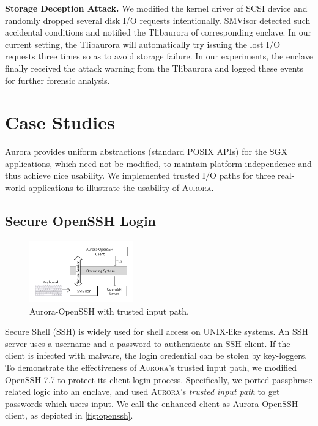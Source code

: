 \textbf{Storage Deception Attack.}
We modified the kernel driver of SCSI device and randomly dropped several disk I/O requests intentionally.  SMVisor detected such accidental conditions and notified the Tlibaurora of corresponding enclave. In our current setting, the Tlibaurora will automatically try issuing the lost I/O requests three times so as to avoid storage failure. In our experiments, the enclave finally received the attack warning from the Tlibaurora and logged these events for further forensic analysis.


\section{Case Studies}\label{casestudy}

Aurora provides uniform abstractions (standard POSIX APIs) for the SGX applications, which need not be modified, to maintain platform-independence and thus achieve nice usability. We implemented trusted I/O paths for three real-world applications to illustrate the usability of \textsc{Aurora}.

\subsection{Secure OpenSSH Login}\label{openssh}

\begin{figure}[t]
	\centering
	\includegraphics[width=0.4\textwidth]{figures/ssh.pdf} %
	\caption{Aurora-OpenSSH with trusted input path.}
	\label{fig:openssh}
\end{figure}

Secure Shell (SSH) is widely used for shell access on UNIX-like systems. An SSH server uses a username and a password to authenticate an SSH client. If the client is infected with malware, the login credential can be stolen by key-loggers. To demonstrate the effectiveness of \textsc{Aurora}'s trusted input path, we modified OpenSSH 7.7 to protect its client login process. Specifically, we ported passphrase related logic into an enclave, and used \textsc{Aurora}'s \textit{trusted input path} to get passwords which users input. We call the enhanced client as Aurora-OpenSSH client, as depicted in \autoref{fig:openssh}.


